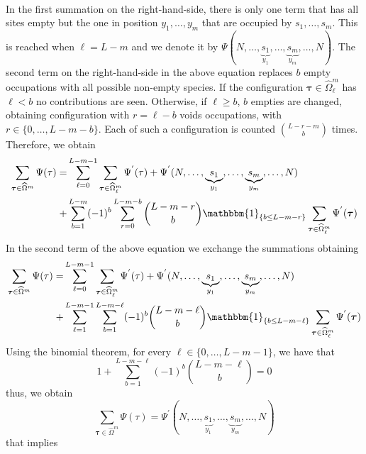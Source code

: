 \documentclass[10pt]{article}
\numberwithin{equation}{section}
\numberwithin{equation}{subsection}
\begin{document}
{\begin{align}
\end{align}
In the first summation on the right-hand-side, there is only one term that has all sites empty but the one in position $y_{1},\ldots,y_{m}$ that are occupied by $s_{1},\ldots,s_{m}$. This is reached when $\ell=L-m$ and we denote it by $\Psi(N,\ldots,\underbrace{s_{1}}_{y_{1}},\ldots,\underbrace{s_{m}}_{y_{m}},\ldots,N)$. The second term on the right-hand-side in the above equation replaces $b$ empty occupations with all possible non-empty species. If the configuration $\bm{\tau}\in\widehat{\Omega}_{\ell}^{m}$ has $\ell<b$ no contributions are seen. Otherwise, if $\ell\geq b$, $b$ empties are changed, obtaining configuration with $r=\ell-b$ voids occupations, with $r\in \{0,\ldots, L-m-b\}$. Each of such a configuration is counted $\binom{L-r-m}{b}$ times. Therefore, we obtain 
\begin{align}
	\sum_{\bm{\tau}\in \widehat{\Omega}^{m}}\Psi(\tau)=& \sum_{\ell=0}^{L-m-1}\sum_{\bm{\tau}\in \widehat{\Omega}^{m}_{\ell}}\Psi^{'}(\tau)+\Psi^{'}(N,\ldots,\underbrace{s_{1}}_{y_{1}},\ldots,\underbrace{s_{m}}_{y_{m}},\ldots,N)\nonumber
	\\+&\sum_{b=1}^{L-m}(-1)^{b}\sum_{r=0}^{L-m-b}\binom{L-m-r}{b}\mathbbm{1}_{\{b\leq L-m-r\}}\sum_{\bm{\tau}\in \widehat{\Omega}^{m}_{\ell}}\Psi^{'}(\bm{\tau})
\end{align}
In the second term of the above equation we exchange the summations obtaining 
\begin{align}
\sum_{\bm{\tau}\in \widehat{\Omega}^{m}}\Psi(\tau)=&\sum_{\ell=0}^{L-m-1}\sum_{\bm{\tau}\in \widehat{\Omega}^{m}_{\ell}}\Psi^{'}(\tau)+\Psi^{'}(N,\ldots,\underbrace{s_{1}}_{y_{1}},\ldots,\underbrace{s_{m}}_{y_{m}},\ldots,N)\nonumber
\\+&\sum_{\ell=1}^{L-m-1}\sum_{b=1}^{L-m-\ell}(-1)^{b}\binom{L-m-\ell}{b}\mathbbm{1}_{\{b\leq L-m-\ell\}}\sum_{\bm{\tau}\in \widehat{\Omega}^{m}_{\ell}}\Psi^{'}(\bm{\tau})
\end{align}
Using the binomial theorem, for every $\ell\in \{0,\ldots, L-m-1\}$, we have that
\begin{equation}
	1+\sum_{b=1}^{L-m-\ell}(-1)^{b}\binom{L-m-\ell}{b}=0
\end{equation}
thus, we obtain 
\begin{equation}
\sum_{\bm{\tau}\in \widehat{\Omega}^{m}}\Psi(\tau)=\Psi^{'}(N,\ldots,\underbrace{s_{1}}_{y_{1}},\ldots,\underbrace{s_{m}}_{y_{m}},\ldots,N)
\end{equation}
that implies 
\begin{equation}\label{shorter-chain}

\end{equation}}
\end{document}
